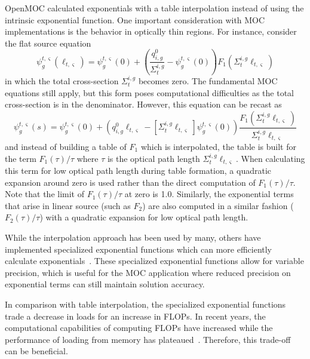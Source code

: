 OpenMOC calculated exponentials with a table interpolation instead of using the intrinsic exponential function. One important consideration with \ac{MOC} implementations is the behavior in optically thin regions. For instance, consider the flat source equation
\begin{equation*}
	\psi_g^{t,\varsigma}(\ell_{t,\varsigma}) = \psi^{t,\varsigma}_g(0) + \left( \frac{q^0_{i,g}}{\Sigma_{t}^{i,g}} - \psi_g^{t,\varsigma}(0) \right) F_1\left(\Sigma_{t}^{i,g} \ell_{t,\varsigma} \right)
\end{equation*}
in which the total cross-section $\Sigma_{t}^{i,g}$ becomes zero. The fundamental \ac{MOC} equations still apply, but this form poses computational difficulties as the total cross-section is in the denominator. However, this equation can be recast as
\begin{equation}
\psi_g^{t,\varsigma}(s) = \psi^{t,\varsigma}_g(0) + \left(q^0_{i,g} \ell_{t,\varsigma} - \left[\Sigma_{t}^{i,g} \ell_{t,\varsigma}\right]\psi_g^{t,\varsigma}(0) \right) \frac{F_1\left(\Sigma_{t}^{i,g} \ell_{t,\varsigma} \right)}{\Sigma_{t}^{i,g} \ell_{t,\varsigma}}
\end{equation}
and instead of building a table of $F_1$ which is interpolated, the table is built for the term $F_1(\tau) / \tau$ where $\tau$ is the optical path length $\Sigma_{t}^{i,g} \ell_{t,\varsigma}$. When calculating this term for low optical path length during table formation, a quadratic expansion around zero is used rather than the direct computation of $F_1(\tau) / \tau$. Note that the limit of $F_1(\tau) / \tau$ at zero is 1.0. Similarly, the exponential terms that arise in linear source (such as $F_2$) are also computed in a similar fashion ($F_2(\tau) / \tau$) with a quadratic expansion for low optical path length.

While the interpolation approach has been used by many, others have implemented specialized exponential functions which can more efficiently calculate exponentials~\cite{colin-exp}. These specialized exponential functions allow for variable precision, which is useful for the \ac{MOC} application where reduced precision on exponential terms can still maintain solution accuracy. 

In comparison with table interpolation, the specialized exponential functions trade a decrease in loads for an increase in \acp{FLOP}. In recent years, the computational capabilities of computing \acp{FLOP} have increased while the performance of loading from memory has plateaued~\cite{Patterson_1997}. Therefore, this trade-off can be beneficial.

